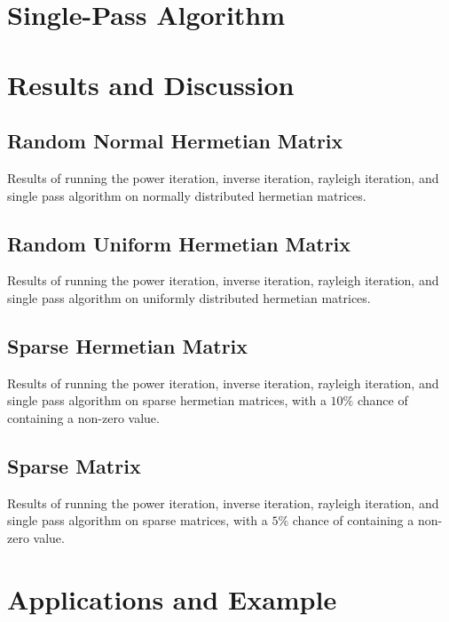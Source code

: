 \documentclass[11pt]{amsart}
\begin{document}
\section{Single-Pass Algorithm}
\section{Results and Discussion}

\subsection{Random Normal Hermetian Matrix}
Results of running the power iteration, inverse iteration, rayleigh iteration, and single pass algorithm on normally distributed hermetian matrices.



\subsection{Random Uniform Hermetian Matrix}
Results of running the power iteration, inverse iteration, rayleigh iteration, and single pass algorithm on uniformly distributed hermetian matrices.



\subsection{Sparse Hermetian Matrix}
Results of running the power iteration, inverse iteration, rayleigh iteration, and single pass algorithm on sparse hermetian matrices, with a $10\%$ chance of containing a non-zero value.



\subsection{Sparse Matrix}
Results of running the power iteration, inverse iteration, rayleigh iteration, and single pass algorithm on sparse matrices, with a $5\%$ chance of containing a non-zero value.




\section{Applications and Example}

\end{document}

